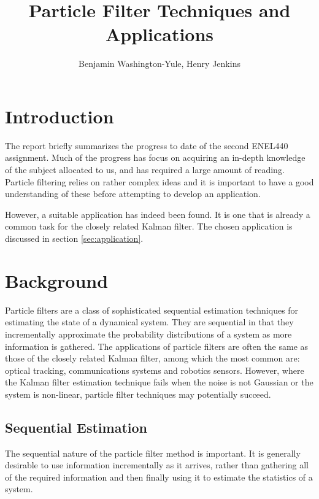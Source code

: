 \documentclass[11pt]{article}
\begin{document}
\title{Particle Filter Techniques and Applications}
\author{Benjamin Washington-Yule, Henry Jenkins}
\maketitle

\section{Introduction}
The report briefly summarizes the progress to date of the second ENEL440
assignment. Much of the progress has focus on acquiring an in-depth knowledge
of the subject allocated to us, and has required a large amount of reading.
Particle filtering relies on rather complex ideas and it is important to have
a good understanding of these before attempting to develop an application.

However, a suitable application has indeed been found. It is one that is already
a common task for the closely related Kalman filter. The chosen application is
discussed in section \ref{sec:application}.

\section{Background}
Particle filters are a class of sophisticated sequential estimation techniques
for estimating the state of a dynamical system. They are sequential in that they
incrementally approximate the probability distributions of a system as more
information is gathered. The applications of particle filters are often the
same as those of the closely related Kalman filter, among which the most common
are: optical tracking, communications systems and robotics sensors. However,
where the Kalman filter estimation technique fails when the noise is not
Gaussian or the system is non-linear, particle filter techniques may potentially
succeed.

\subsection{Sequential Estimation}
The sequential nature of the particle filter method is important. It is
generally desirable to use information incrementally as it arrives, rather
than gathering all of the required information and then finally using it to
estimate the statistics of a system. 
\end{document}
